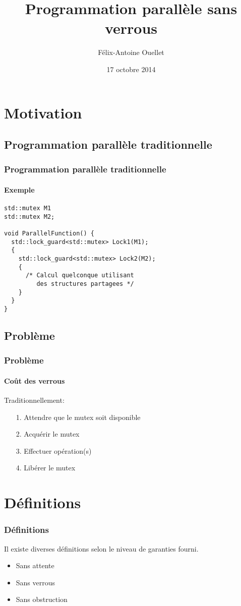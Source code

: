 \documentclass{beamer}
\author[Félix-Antoine Ouellet]{Félix-Antoine Ouellet}
\title[Lock-free\hspace{2em}\insertframenumber/\inserttotalframenumber]{Programmation parallèle sans verrous}
\institute{Université de Sherbrooke}
\date{17 octobre 2014}
\begin{document}
\begin{frame}
\titlepage %
\end{frame}

\begin{frame}
\tableofcontents[hideallsubsections]
\end{frame}

\section{Motivation}
\subsection{Programmation parallèle traditionnelle}
\begin{frame}[fragile]
\frametitle{Programmation parallèle traditionnelle}
\framesubtitle{Exemple}
\begin{lstlisting}
std::mutex M1
std::mutex M2;

void ParallelFunction() {
  std::lock_guard<std::mutex> Lock1(M1);
  {
    std::lock_guard<std::mutex> Lock2(M2);
    {
      /* Calcul quelconque utilisant 
         des structures partagees */  
    }
  }    
}
\end{lstlisting}
\end{frame}

\subsection{Problème}
\begin{frame}
\frametitle{Problème}
\framesubtitle{Coût des verrous}
Traditionnellement:
\begin{itemize}
\item[1.] Attendre que le mutex soit disponible
\item[2.] Acquérir le mutex
\item[3.] Effectuer opération(s)
\item[4.] Libérer le mutex
\end{itemize}
\end{frame}

\section{Définitions}
\begin{frame}
\frametitle{Définitions}
Il existe diverses définitions selon le niveau de garanties fourni.
\begin{itemize}
\item Sans attente
\item Sans verrous
\item Sans obstruction
\end{itemize}
\end{frame}
\end{document}
